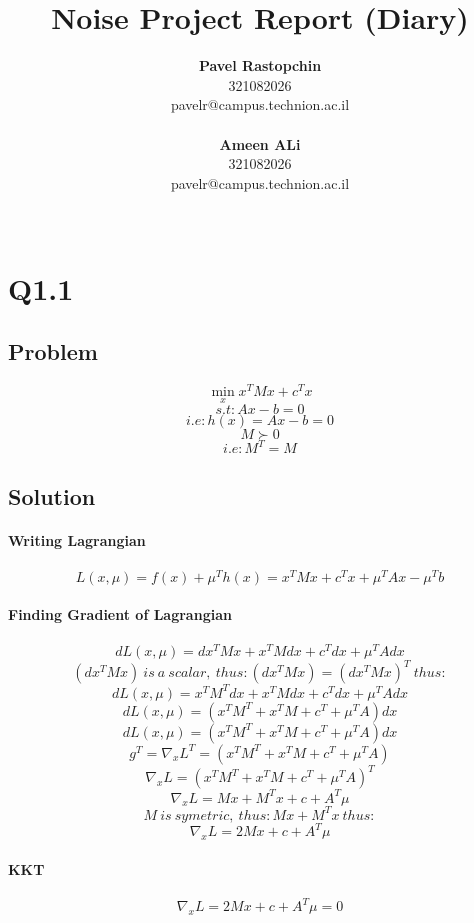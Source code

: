 \documentclass[12pt]{article}
\begin{document}
\title{\Huge Noise Project Report (Diary)}

\author{
  \textbf{Pavel Rastopchin}\\
	321082026 \\ pavelr@campus.technion.ac.il
  \\ \\
  \textbf{Ameen ALi}\\
  	321082026 \\ pavelr@campus.technion.ac.il
  \\ \\ 
}

\maketitle


\newpage
\section{Q1.1}
\subsection{Problem}
\[\min_x x^T M x + c^T x\]
\[s.t: Ax - b = 0\]
\[i.e: h(x)= Ax - b = 0\]
\[M \succ 0\] 
\[i.e: M^T=M\]

\subsection{Solution}
\paragraph{Writing Lagrangian}
\[L(x, \mu)=f(x) + \mu ^T h(x) = x^T M x + c^T x + \mu ^T A x - \mu ^ T b\]

\paragraph{Finding Gradient of Lagrangian}
\[dL(x, \mu)= dx^T Mx + x^T Mdx + c^T dx + \mu ^T Adx \]
\[(dx^T Mx)\ is \ a \ scalar, \ thus: (dx^T Mx) = (dx^T Mx)^T \ thus:\]
\[dL(x, \mu) = x^T M^T dx + x^T M dx + c^T dx + \mu ^T Adx \]
\[dL(x, \mu)= (x^T M^T + x^T M + c^T + \mu ^T A)dx \]
\[dL(x, \mu)= (x^T M^T + x^T M + c^T + \mu ^T A)dx \]
\[g^T = \nabla_x L^T = (x^T M^T + x^T M + c^T + \mu ^T A)\]
\[\nabla_x L = (x^T M^T + x^T M + c^T + \mu ^T A)^T\]
\[\nabla_x L = Mx + M^T x + c + A^T \mu\]
\[M \ is \ symetric, \ thus: Mx + M^T x\ thus:\]
\[\nabla_x L = 2Mx + c + A^T \mu\]
\paragraph{KKT}
\[\nabla_x L = 2Mx + c + A^T \mu = 0 \]
\end{document}

